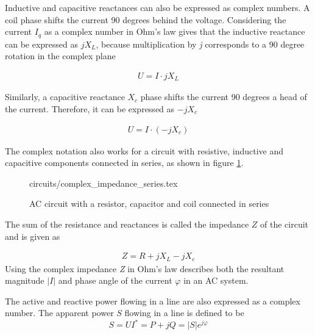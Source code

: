 \documentclass[class=book, crop=false]{standalone}
\begin{document}
Inductive and capacitive reactances can also be expressed as complex numbers. A coil phase shifts the current 90 degrees behind the voltage. Considering the current $I_{q}$ as a complex number in Ohm's law gives that the inductive reactance can be expressed as $jX_{L}$, because multiplication by \textit{j} corresponds to a 90 degree rotation in the complex plane

\begin{equation}
   \begin{aligned}\label{eq:theory:complex_rectance_capacitive}
U = I\cdot jX_{L}
\end{aligned} 
\end{equation}

Similarly, a capacitive reactance $X_{c}$ phase shifts the current 90 degrees a head of the current. Therefore, it can be expressed as $-jX_{c}$

\begin{equation}
   \begin{aligned}\label{eq:theory:complex_rectance_inductance}
U = I\cdot (-jX_{c})
\end{aligned} 
\end{equation}

The complex notation also works for a circuit with resistive, inductive and capacitive components connected in series, as shown in figure \ref{fig:theory:complex_impedance_series}.

\begin{figure}[ht!]
    \center
    {circuits/complex_impedance_series.tex}
    \caption[size = 9]
    {AC circuit with a resistor, capacitor and coil connected in series}\label{fig:theory:complex_impedance_series}
\end{figure}

The sum of the resistance and reactances is called the impedance $Z$ of the circuit and is given as

\begin{equation}
   \begin{aligned}\label{eq:theory:complex_impedance}
Z = R + jX_{L} - jX_{c}
\end{aligned} 
\end{equation}
Using the complex impedance \textit{Z} in Ohm's law describes both the resultant magnitude $|I|$ and phase angle of the current $\varphi$ in an AC system.

The active and reactive power flowing in a line are also expressed as a complex number. The apparent power $S$ flowing in a line is defined to be
\begin{equation}\label{eq:theory_apparent_power}
    S  = UI^{*} = P + jQ = |S|e^{j\varphi}
\end{equation}
\end{document}

